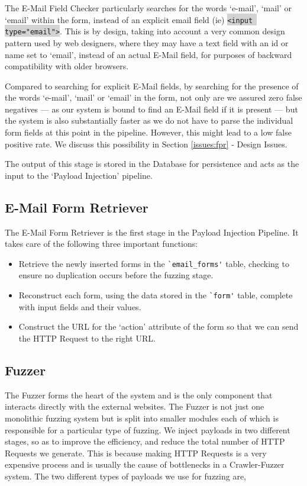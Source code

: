The E-Mail Field Checker particularly searches for the words `e-mail', `mail' or `email' within the form, instead of an explicit email field (ie) \colorbox{lightgray}{\lstinline{<input type="email">}}. This is by design, taking into account a very common design pattern used by web designers, where they may have a text field with an id or name set to `email', instead of an actual E-Mail field, for purposes of backward compatibility with older browsers.

Compared to searching for explicit E-Mail fields, by searching for the presence of the words `e-mail', `mail' or `email' in the form, not only are we assured zero false negatives --- as our system is bound to find an E-Mail field if it is present --- but the system is also substantially faster as we do not have to parse the individual form fields at this point in the pipeline. However, this might lead to a low false positive rate. We discuss this possibility in Section \ref*{issues:fpr} - Design Issues. 

The output of this stage is stored in the Database for persistence and acts as the input to the `Payload Injection' pipeline.


\subsection{E-Mail Form Retriever}
\label{Comp:EMFR}
The E-Mail Form Retriever is the first stage in the Payload Injection Pipeline. It takes care of the following three important functions:
\begin{itemize}
	\item Retrieve the newly inserted forms in the \lstinline{`email_forms'} table, checking to ensure no duplication occurs before the fuzzing stage.
	\item Reconstruct each form, using the data stored in the \lstinline{`form'} table, complete with input fields and their values.
	\item Construct the URL for the `action' attribute of the form so that we can send the HTTP Request to the right URL. 
\end{itemize}

\subsection{Fuzzer}
\label{Comp:Fuzzer}
The Fuzzer forms the heart of the system and is the only component that interacts directly with the external websites. The Fuzzer is not just one monolithic fuzzing system but is split into smaller modules each of which is responsible for a particular type of fuzzing.  We inject payloads in two different stages, so as to improve the efficiency, and reduce the total number of HTTP Requests we generate. This is because making HTTP Requests is a very expensive process and is usually the cause of bottlenecks in a Crawler-Fuzzer system.
The two different types of payloads we use for fuzzing are,
